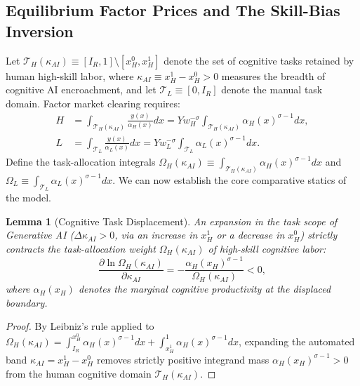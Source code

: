 \documentclass[12pt]{article}
\newtheorem{lemma}{Lemma}
\begin{document}
\subsection{Equilibrium Factor Prices and The Skill-Bias Inversion}

Let $\mathcal{T}_H(\kappa_{AI}) \equiv [I_R, 1] \setminus [x_H^0, x_H^1]$ denote the set of cognitive tasks retained by human high-skill labor, where $\kappa_{AI} \equiv x_H^1 - x_H^0 > 0$ measures the breadth of cognitive AI encroachment, and let $\mathcal{T}_L \equiv [0, I_R]$ denote the manual task domain. Factor market clearing requires:
\begin{align}
\label{eq:clearing_h}
H &= \int_{\mathcal{T}_H(\kappa_{AI})} \frac{y(x)}{\alpha_H(x)} dx = Y w_H^{-\sigma} \int_{\mathcal{T}_H(\kappa_{AI})} \alpha_H(x)^{\sigma - 1} dx, \\
\label{eq:clearing_l}
L &= \int_{\mathcal{T}_L} \frac{y(x)}{\alpha_L(x)} dx = Y w_L^{-\sigma} \int_{\mathcal{T}_L} \alpha_L(x)^{\sigma - 1} dx.
\end{align}
Define the task-allocation integrals $\Omega_H(\kappa_{AI}) \equiv \int_{\mathcal{T}_H(\kappa_{AI})} \alpha_H(x)^{\sigma - 1} dx$ and $\Omega_L \equiv \int_{\mathcal{T}_L} \alpha_L(x)^{\sigma - 1} dx$. We can now establish the core comparative statics of the model.

\begin{lemma}[Cognitive Task Displacement]
\label{lem:displacement}
An expansion in the task scope of Generative AI ($\Delta \kappa_{AI} > 0$, via an increase in $x_H^1$ or a decrease in $x_H^0$) strictly contracts the task-allocation weight $\Omega_H(\kappa_{AI})$ of high-skill cognitive labor:
\begin{equation}
\frac{\partial \ln \Omega_H(\kappa_{AI})}{\partial \kappa_{AI}} = -\frac{\alpha_H(x_H)^{\sigma - 1}}{\Omega_H(\kappa_{AI})} < 0,
\end{equation}
where $\alpha_H(x_H)$ denotes the marginal cognitive productivity at the displaced boundary.
\end{lemma}
\begin{proof}
By Leibniz's rule applied to $\Omega_H(\kappa_{AI}) = \int_{I_R}^{x_H^0} \alpha_H(x)^{\sigma - 1} dx + \int_{x_H^1}^1 \alpha_H(x)^{\sigma - 1} dx$, expanding the automated band $\kappa_{AI} = x_H^1 - x_H^0$ removes strictly positive integrand mass $\alpha_H(x_H)^{\sigma - 1} > 0$ from the human cognitive domain $\mathcal{T}_H(\kappa_{AI})$.
\end{proof}
\end{document}
